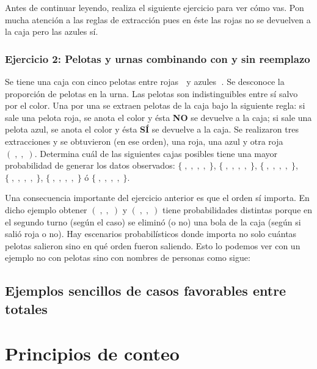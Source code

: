 \documentclass[
]{book}
\newenvironment{Ejercicio}
{\begin{mdframed}[
  linecolor=ejerciciocolor,
  skipabove=12pt,
  skipbelow=12pt,
  roundcorner=20pt,
  splittopskip=2\topsep]}
{\end{mdframed}}
\begin{document}
Antes de continuar leyendo, realiza el siguiente ejercicio para ver cómo vas. Pon mucha atención a las reglas de extracción pues en éste las rojas no se devuelven a la caja pero las azules sí.

\begin{Ejercicio}
\hypertarget{ejercicio-2-pelotas-y-urnas-combinando-con-y-sin-reemplazo}{%
\subsubsection{Ejercicio 2: Pelotas y urnas combinando con y sin
reemplazo}\label{ejercicio-2-pelotas-y-urnas-combinando-con-y-sin-reemplazo}}

Se tiene una caja con cinco pelotas entre rojas 🔴 y azules 🔵. Se
desconoce la proporción de pelotas en la urna. Las pelotas son
indistinguibles entre sí salvo por el color. Una por una se extraen
pelotas de la caja bajo la siguiente regla: si sale una pelota roja, se
anota el color y ésta \textbf{NO} se devuelve a la caja; si sale una
pelota azul, se anota el color y ésta \textbf{SÍ} se devuelve a la caja.
Se realizaron tres extracciones y se obtuvieron (en ese orden), una
roja, una azul y otra roja \(( 🔴, 🔵, 🔴)\). Determina cuál de las
siguientes cajas posibles tiene una mayor probabilidad de generar los
datos observados: \(\{ 🔴, 🔴, 🔴, 🔴, 🔴\}\), \(\{ 🔴, 🔴, 🔴, 🔴, 🔵\}\),
\(\{ 🔴, 🔴, 🔴, 🔵, 🔵\}\), \(\{ 🔴, 🔴, 🔵, 🔵, 🔵\}\), \(\{ 🔴, 🔵, 🔵, 🔵, 🔵\}\) ó
\(\{ 🔵, 🔵, 🔵, 🔵, 🔵\}\).
\end{Ejercicio}

Una consecuencia importante del ejercicio anterior es que el orden sí importa. En dicho ejemplo obtener \(( 🔴, 🔵, 🔴)\) y \(( 🔴, 🔴, 🔵)\) tiene probabilidades distintas porque en el segundo turno (según el caso) se eliminó (o no) una bola de la caja (según si salió roja o no). Hay escenarios probabilísticos donde importa no solo cuántas pelotas salieron sino en qué orden fueron saliendo. Esto lo podemos ver con un ejemplo no con pelotas sino con nombres de personas como sigue:

\hypertarget{ejemplos-sencillos-de-casos-favorables-entre-totales}{%
\subsection{Ejemplos sencillos de casos favorables entre totales}\label{ejemplos-sencillos-de-casos-favorables-entre-totales}}

\hypertarget{principios-de-conteo}{%
\section{Principios de conteo}\label{principios-de-conteo}}
\end{document}
